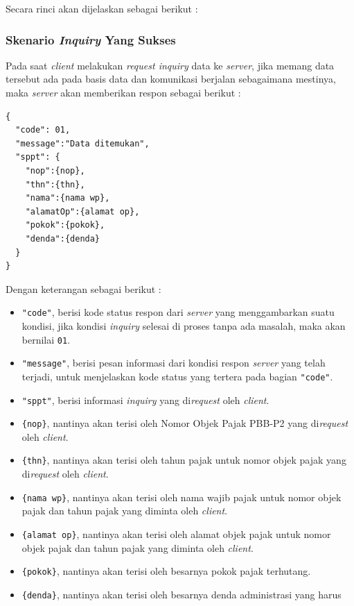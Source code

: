 \documentclass[pdftex,12pt, oneside]{article}
\begin{document}
Secara rinci akan dijelaskan sebagai berikut :

\subsubsection{Skenario \textit{Inquiry} Yang Sukses}

  Pada saat \textit{client} melakukan \textit{request inquiry} data ke \textit{server}, jika memang data tersebut ada pada basis data dan komunikasi berjalan sebagaimana mestinya, maka \textit{server} akan memberikan respon sebagai berikut :
  
  \begin{lstlisting}
{
  "code": 01,
  "message":"Data ditemukan",
  "sppt": {
    "nop":{nop},
    "thn":{thn},
    "nama":{nama wp},
    "alamatOp":{alamat op},
    "pokok":{pokok},
    "denda":{denda}
  }
}
  \end{lstlisting}
  
  Dengan keterangan sebagai berikut :
  
  \begin{itemize}
    \item \texttt{"code"}, berisi kode status respon dari \textit{server} yang menggambarkan suatu kondisi, jika kondisi \textit{inquiry} selesai di proses tanpa ada masalah, maka akan bernilai \texttt{01}.
    
    \item \texttt{"message"}, berisi pesan informasi dari kondisi respon \textit{server} yang telah terjadi, untuk menjelaskan kode status yang tertera pada bagian \texttt{"code"}.
    
    \item \texttt{"sppt"}, berisi informasi \textit{inquiry} yang di\textit{request} oleh \textit{client}.
    
    \item \texttt{\{nop\}}, nantinya akan terisi oleh Nomor Objek Pajak PBB-P2 yang di\textit{request} oleh \textit{client}.
    
    \item \texttt{\{thn\}}, nantinya akan terisi oleh tahun pajak untuk nomor objek pajak yang di\textit{request} oleh \textit{client}.
    
    \item \texttt{\{nama wp\}}, nantinya akan terisi oleh nama wajib pajak untuk nomor objek pajak dan tahun pajak yang diminta oleh \textit{client}.
    
    \item \texttt{\{alamat op\}}, nantinya akan terisi oleh alamat objek pajak untuk nomor objek pajak dan tahun pajak yang diminta oleh \textit{client}.
    
    \item \texttt{\{pokok\}}, nantinya akan terisi oleh besarnya pokok pajak terhutang.
    
    \item \texttt{\{denda\}}, nantinya akan terisi oleh besarnya denda administrasi yang harus 
  \end{itemize}
\end{document}
